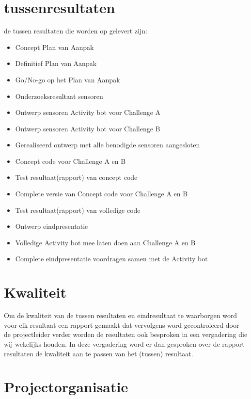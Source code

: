 \documentclass[oneside]{book}
\begin{document}
\chapter{tussenresultaten}
	de tussen resultaten die worden op gelevert zijn:
\begin{itemize}
	\item Concept Plan van Aanpak
	\item Definitief Plan van Aanpak
	\item Go/No-go op het Plan van Aanpak
	\item Onderzoeksresultaat sensoren
	\item Ontwerp sensoren Activity bot voor Challenge A
	\item Ontwerp sensoren Activity bot voor Challenge B
	\item Gerealiseerd ontwerp met alle benodigde sensoren aangesloten
	\item Concept code voor Challenge A en B
	\item Test resultaat(rapport) van concept code
	\item Complete versie van Concept code voor Challenge A en B
	\item Test resultaat(rapport) van volledige code
	\item Ontwerp eindpresentatie
	\item Volledige Activity bot mee laten doen aan Challenge A en B
	\item Complete eindpresentatie voordragen samen met de Activity bot
\end{itemize}
\clearpage
\chapter{Kwaliteit}
	Om de kwaliteit van de tussen resultaten en eindresultaat te waarborgen word voor elk resultaat een rapport gemaakt dat vervolgens word gecontroleerd door de projectleider
	 verder worden de resultaten ook besproken in een vergadering die wij wekelijks houden. In deze vergadering word er dan gesproken over de rapport resultaten  de kwaliteit aan te passen van het (tussen) resultaat.
\clearpage
\chapter{Projectorganisatie}
\end{document}

